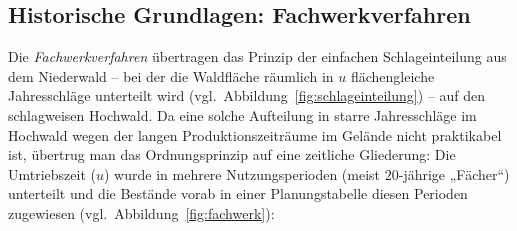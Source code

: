 \documentclass[twocolumn, paper=a4, fontsize=10pt]{scrartcl}
\begin{document}
\subsection{Historische Grundlagen: Fachwerkverfahren}

Die \emph{Fachwerkverfahren} übertragen das Prinzip der einfachen Schlageinteilung aus dem Niederwald -- bei der die Waldfläche räumlich in $u$ flächengleiche Jahresschläge unterteilt wird (vgl.\ Abbildung~\ref{fig:schlageinteilung}) -- auf den schlagweisen Hochwald. Da eine solche Aufteilung in starre Jahresschläge im Hochwald wegen der langen Produktionszeiträume im Gelände nicht praktikabel ist, übertrug man das Ordnungsprinzip auf eine zeitliche Gliederung: Die Umtriebszeit ($u$) wurde in mehrere Nutzungsperioden (meist $20$-jährige „Fächer“) unterteilt und die Bestände vorab in einer Planungstabelle diesen Perioden zugewiesen (vgl.\ Abbildung~\ref{fig:fachwerk}):
\end{document}
